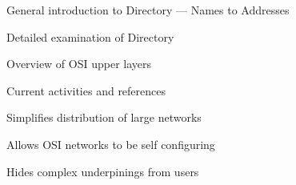 \begin{bwslide}
\end{bwslide}

\begin{bwslide}
\begin{nrtc}
\item	General introduction to Directory --- Names to Addresses
\item	Detailed examination of Directory
\item	Overview of OSI upper layers
\item	Current activities and references
\end{nrtc}
\end{bwslide}

\begin{bwslide}

\begin{nrtc}
\item	Simplifies distribution of large networks
\item	Allows OSI networks to be self configuring
\item	Hides complex underpinings from users
\end{nrtc}
\end{bwslide}



